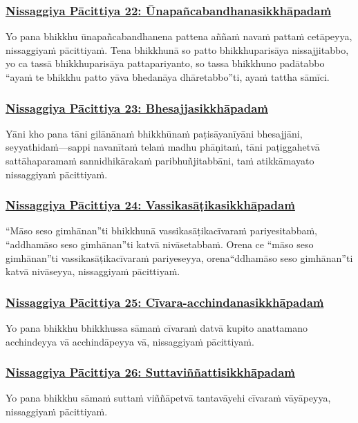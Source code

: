 \subsubsection*{\hyperref[forf-exp22]{Nissaggiya Pācittiya 22: Ūnapañcabandhanasikkhāpadaṁ}}
\label{np22}
Yo pana bhikkhu ūnapañcabandhanena pattena aññaṁ navaṁ pattaṁ cetāpeyya, nissaggiyaṁ pācittiyaṁ. Tena bhikkhunā so patto bhikkhuparisāya nissajjitabbo, yo ca tassā bhikkhuparisāya pattapariyanto, so tassa bhikkhuno padātabbo “ayaṁ te bhikkhu patto yāva bhedanāya dhāretabbo”ti, ayaṁ tattha sāmīci.

\subsubsection*{\hyperref[forf-exp23]{Nissaggiya Pācittiya 23: Bhesajjasikkhāpadaṁ}}
\label{np23}
Yāni kho pana tāni gilānānaṁ bhikkhūnaṁ paṭisāyanīyāni bhesajjāni, seyyathidaṁ—sappi navanītaṁ telaṁ madhu phāṇitaṁ, tāni paṭiggahetvā sattāhaparamaṁ sannidhikārakaṁ paribhuñjitabbāni, taṁ atikkāmayato nissaggiyaṁ pācittiyaṁ.

\subsubsection*{\hyperref[forf-exp24]{Nissaggiya Pācittiya 24: Vassikasāṭikasikkhāpadaṁ}}
\label{np24}
“Māso seso gimhānan''ti bhikkhunā vassikasāṭikacīvaraṁ pariyesitabbaṁ, “addhamāso seso gimhānan''ti katvā nivāsetabbaṁ. Orena ce “māso seso gimhānan''ti vassikasāṭikacīvaraṁ pariyeseyya, orena“ddhamāso seso gimhānan''ti katvā nivāseyya, nissaggiyaṁ pācittiyaṁ.

\subsubsection*{\hyperref[forf-exp25]{Nissaggiya Pācittiya 25: Cīvara-acchindanasikkhāpadaṁ}}
\label{np25}
Yo pana bhikkhu bhikkhussa sāmaṁ cīvaraṁ datvā kupito anattamano acchindeyya vā acchindāpeyya vā, nissaggiyaṁ pācittiyaṁ.

\subsubsection*{\hyperref[forf-exp26]{Nissaggiya Pācittiya 26: Suttaviññattisikkhāpadaṁ}}
\label{np26}
Yo pana bhikkhu sāmaṁ suttaṁ viññāpetvā tantavāyehi cīvaraṁ vāyāpeyya, nissaggiyaṁ pācittiyaṁ.

